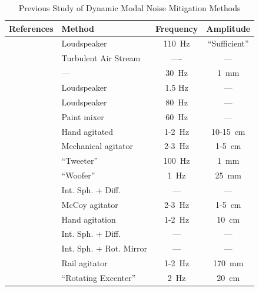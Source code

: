 \begin{table}
\centering
\caption[Modal noise mitigation techniques]{Previous Study of Dynamic Modal Noise Mitigation Methods}
	\begin{tabular}{llcc}
		\hline
		References & Method & Frequency & Amplitude \\
		\hline\hline
		\citet{daino_speckle_1980} & Loudspeaker & \SI{110}{\hertz} & ``Sufficient'' \\
		\hline
		\citet{hill_modal_1980} & Turbulent Air Stream & ---- & --- \\
		\hline
		\citet{baudrand_modal_2001} & --- & \SI{30}{\hertz} & \SI{1}{\milli\meter} \\
		\hline
		\multirow{2}{*}{\citet{lemke_modal_2011}} & Loudspeaker & 1.5 Hz & --- \\
		 & Loudspeaker & \SI{80}{\hertz} & --- \\
		\hline
		\multirow{3}{*}{\citet{mccoy_optical_2012}} & Paint mixer & \SI{60}{\hertz} & --- \\
		 & Hand agitated & 1-\SI{2}{\hertz} & 10-\SI{15}{\centi\meter} \\
		 & Mechanical agitator & 2-\SI{3}{\hertz} & 1-\SI{5}{\centi\meter} \\
		\hline
		\multirow{2}{*}{\citet{plavchan_precision_2013}} & ``Tweeter'' & \SI{100}{\hertz} & \SI{1}{\milli\meter} \\
		 & ``Woofer'' & \SI{1}{\hertz} & \SI{25}{\milli\meter} \\
		\hline
		\multirow{3}{*}{\citet{mahadevan_suppression_2014}} & Int. Sph. + Diff. & --- & ---\\
		 & McCoy agitator & 2-\SI{3}{\hertz} & 1-\SI{5}{\centi\meter} \\
		 & Hand agitation & 1-\SI{2}{\hertz} & \SI{10}{\centi\meter} \\
		\hline
		\multirow{2}{*}{\citet{halverson_habitable-zone_2014}} & Int. Sph. + Diff. & --- & --- \\
		 & Int. Sph. + Rot. Mirror & --- & --- \\
		\hline		
		\citet{roy_scrambling_2014} & Rail agitator & 1-\SI{2}{\hertz} & \SI{170}{\milli\meter} \\
		\hline
		\citet{sablowski_comparing_2016} & ``Rotating Excenter'' & \SI{2}{\hertz} & \SI{20}{\centi\meter} \\
		\hline
	\end{tabular}
\label{table:previous_studies}
\end{table}

